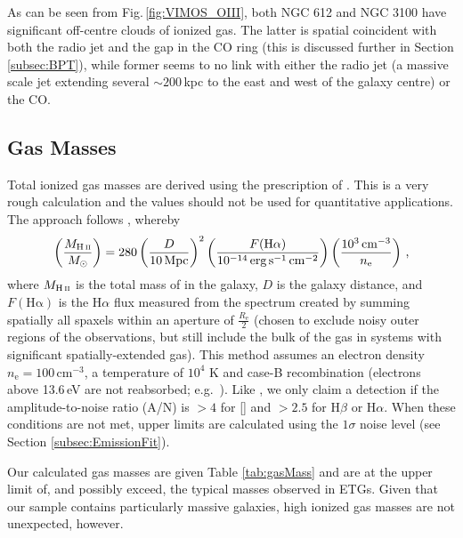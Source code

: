 		As can be seen from Fig.\,\ref{fig:VIMOS_OIII}, both NGC 612 and NGC 3100 have significant off-centre clouds of ionized gas. The latter is spatial coincident with both the radio jet and the gap in the CO ring (this is discussed further in Section \ref{subsec:BPT}), while former seems to no link with either the radio jet (a massive scale jet extending several $\sim 200$\,kpc to the east and west of the galaxy centre) or the CO. 

	\subsection{Gas Masses}
		\label{subsec:GasMass}

		Total ionized gas masses are derived using the prescription of \citet{Sarzi2005}. This is a very rough calculation and the values should not be used for quantitative applications. The approach follows \citet{Kim1989}, whereby
		\begin{equation}
			\left(\frac{M_\text{\ion{H}{ii}}}{M_\odot}\right) = 280 \left(\frac{D}{10\, \mathrm{Mpc}}\right)^2 \left(\frac{F(\mathrm{H\alpha})}{10^{-14} \, \mathrm{erg \, s^{-1} \, cm^{-2}}}\right) \left(\frac{10^3 \, \mathrm{cm^{-3}}}{n_\mathrm{e}}\right) \, ,
		\end{equation}
		where $M_\text{\ion{H}{ii}}$ is the total mass of  in the galaxy, $D$ is the galaxy distance, and $F(\mathrm{H\alpha})$ is the H$\alpha$ flux measured from the spectrum created by summing spatially all spaxels within an aperture of $\frac{R_\mathrm{e}}{2}$ (chosen to exclude noisy outer regions of the observations, but still include the bulk of the gas in systems with significant spatially-extended gas). This method assumes an electron density $n_\mathrm{e} = 100 \, \mathrm{cm^{-3}}$, a temperature of $10^4$ K and case-B recombination (electrons above 13.6\,eV are not reabsorbed; e.g.\ \citealt[p.\,74]{Osterbrock1974}). Like \citet{Sarzi2005}, we only claim a detection if the amplitude-to-noise ratio (A/N) is $>4$ for [] and $>2.5$ for H$\beta$ or H$\alpha$. When these conditions are not met, upper limits are calculated using the $1\sigma$ noise level (see Section \ref{subsec:EmissionFit}).

		Our calculated gas masses are given Table \ref{tab:gasMass} and are at the upper limit of, and possibly exceed, the typical masses observed in ETGs. Given that our sample contains particularly massive galaxies, high ionized gas masses are not unexpected, however.

